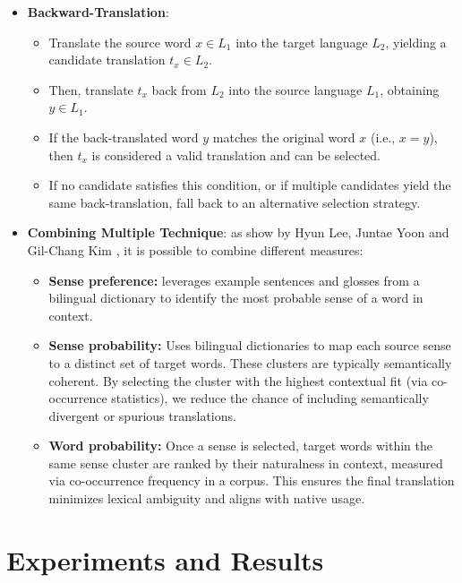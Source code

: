 \documentclass[runningheads]{llncs}
\begin{document}
\begin{itemize}
  \item \textbf{Backward-Translation}: 
    \begin{itemize}
      \item Translate the source word $x \in L_1$ into the target language $L_2$, yielding a candidate translation $t_x \in L_2$.
      \item Then, translate $t_x$ back from $L_2$ into the source language $L_1$, obtaining $y \in L_1$.
      \item If the back-translated word $y$ matches the original word $x$ (i.e., $x = y$), then $t_x$ is considered a valid translation and can be selected.
      \item If no candidate satisfies this condition, or if multiple candidates yield the same back-translation, fall back to an alternative selection strategy.
    \end{itemize}
  \item \textbf{Combining Multiple Technique}: as show by Hyun Lee, Juntae Yoon and Gil-Chang Kim \cite{Translation2003}, it is possible to combine different measures:

\begin{itemize}
  \item \textbf{Sense preference:} leverages example sentences and glosses from a bilingual dictionary to identify the most probable sense of a word in context.

  \item \textbf{Sense probability:} Uses bilingual dictionaries to map each source sense to a distinct set of target words. These clusters are typically semantically coherent. By selecting the cluster with the highest contextual fit (via co-occurrence statistics), we reduce the chance of including semantically divergent or spurious translations.

  \item \textbf{Word probability:} Once a sense is selected, target words within the same sense cluster are ranked by their naturalness in context, measured via co-occurrence frequency in a corpus. This ensures the final translation minimizes lexical ambiguity and aligns with native usage.
\end{itemize}
\end{itemize}

\section{Experiments and Results}
\end{document}
